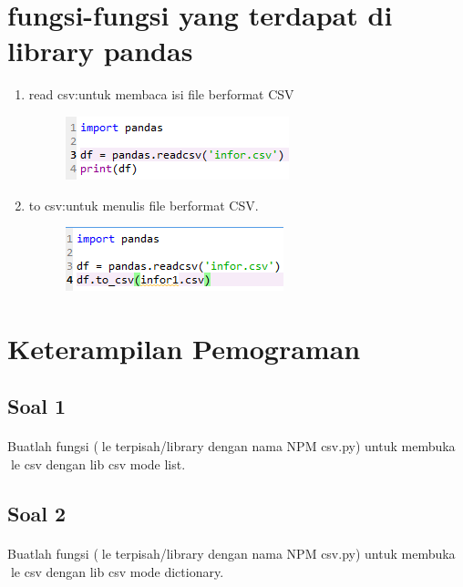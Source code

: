 \documentclass[a4paper,12pt]{report}
\begin{document}
\section*{fungsi-fungsi yang terdapat di library pandas}
\begin{enumerate}

\item read csv:untuk membaca isi file berformat CSV
\begin{figure}[h]
\includegraphics[scale=0.5]{gambar/9.png}
\end{figure}

\item to csv:untuk menulis file berformat CSV.
\begin{figure}[h]
\includegraphics[scale=0.5]{gambar/10.png}
\end{figure}
\end{enumerate}

\section*{Keterampilan Pemograman}
\subsection*{Soal 1}
\paragraph{}Buatlah fungsi (le terpisah/library dengan nama NPM csv.py) untuk membuka le csv dengan lib csv mode list.


\subsection*{Soal 2}
\paragraph{}Buatlah fungsi (le terpisah/library dengan nama NPM csv.py) untuk membuka le csv dengan lib csv mode dictionary.

\end{document}
